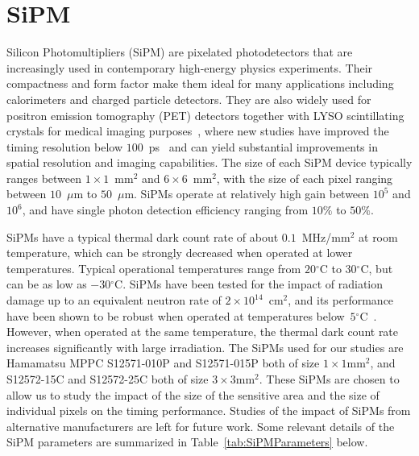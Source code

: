 \section{SiPM}
\label{sec:sipm}

Silicon Photomultipliers (SiPM) are pixelated photodetectors that are increasingly
used in contemporary high-energy physics experiments. Their compactness and form
factor make them ideal for many applications including calorimeters and charged
particle detectors. They are also widely used for positron emission tomography
(PET) detectors together with LYSO scintillating crystals for medical imaging
purposes~\cite{Vandenberghe2016}, where new studies have improved the 
timing resolution below $100$~ps~\cite{LecoqTOFPET} and 
 can yield substantial improvements in spatial resolution and imaging 
 capabilities. The size of each SiPM device typically
ranges between $1\times 1$~$\mathrm{mm}^{2}$ and $6\times 6$~$\mathrm{mm}^{2}$,
with the size of each pixel ranging between $10$~$\mu$m to $50$~$\mu$m. SiPMs operate
at relatively high gain between $10^{5}$ and $10^{6}$, and have single photon detection
efficiency ranging from $10\%$ to $50\%$. 


SiPMs have a typical thermal dark count rate of about
$0.1$~MHz/$\mathrm{mm}^{2}$ at room temperature, which can be strongly decreased
when operated at lower temperatures. Typical operational temperatures range from
$20$$^{\circ}$C to $30$$^{\circ}$C, but can be as low as $-30$$^{\circ}$C. SiPMs have
been tested for the impact of radiation damage up to an equivalent neutron rate
of $2\times10^{14}$~$\mathrm{cm}^{2}$, and its performance have been shown to be
robust when operated at temperatures 
below~$5$$^{\circ}$C~\cite{SiPMIrradiated1,SiPMIrradiated2}. However, when operated
at the same temperature, the thermal dark count rate increases significantly
with large irradiation. The SiPMs used for our studies are Hamamatsu MPPC
S12571-010P and S12571-015P both of size $1\times1\mathrm{mm}^{2}$, and
S12572-15C and S12572-25C both of size $3\times3\mathrm{mm}^{2}$. These SiPMs
are chosen to allow us to study the impact of the size of the sensitive area and
the size of individual pixels on the timing performance. Studies of the impact
of SiPMs from alternative manufacturers are left for future work. Some relevant
details of the SiPM parameters are summarized in Table~\ref{tab:SiPMParameters}
below.

